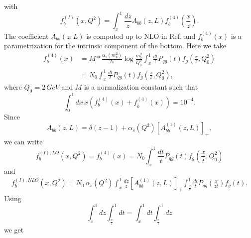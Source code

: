 \documentclass[10pt,a4paper]{article}
\begin{document}
with 
\begin{equation}
f_b^{\left(I\right)}\left(x,Q^2\right)=\int_x^1 \frac{dz}{z}A_{bb}\left(z,L\right)f_b^{\left(4\right)}\left(\frac{x}{z}\right).
\end{equation}
The coefficient $A_{bb}\left(z,L\right) $ is computed up to NLO in Ref.\cite{4} and $f_b^{\left(4\right)}\left(x\right) $ is a parametrization for the intrinsic component of the bottom. Here we take 
\begin{equation}
\begin{split}
f_b^{\left(4\right)}\left(x\right) &= M*\frac{\alpha_s\left(m_b^2\right)}{2\pi}\log\frac{m_b^2}{Q_0^2}\int_x^1 \frac{dt}{t}P_{qg}\left(t\right)f_g\left(\frac{x}{t},Q_0^2\right) \\
&= N_0 \int_x^1 \frac{dt}{t}P_{qg}\left(t\right)f_g\left(\frac{x}{t},Q_0^2\right),
\end{split}
\end{equation}
where $Q_0=2 \,GeV$ and $M$ is a normalization constant such that
\begin{equation}
\int_0^1 dx \, x\left(f_b^{\left(4\right)}\left(x\right)+ f_{\bar{b}}^{\left(4\right)}\left(x\right)\right) = 10^{-4}.
\end{equation}
Since
\begin{equation}
A_{bb}\left(z,L\right)= \delta\left(z-1\right) + \alpha_s\left(Q^2\right)\left[A_{bb}^{\left(1\right)}\left(z,L\right)\right]_{+},
\end{equation}
we can write
\begin{equation}
f_b^{\left(I\right),LO}\left(x,Q^2\right)= f_b^{\left(4\right)}\left(x\right) = N_0\int_x^1 \frac{dt}{t}P_{qg}\left(t\right)f_g\left(\frac{x}{t},Q_0^2\right)
\end{equation} 
and 
\begin{equation}
\begin{split}
f_b^{\left(I\right),NLO}\left(x,Q^2\right)= N_0\,\alpha_s\left(Q^2\right) \int_x^1 \frac{dz}{z} \left[A_{bb}^{\left(1\right)}\left(z,L\right)\right]_{+}\int_{\frac{x}{z}}^{1}\frac{dt}{t}P_{qg}\left(\frac{x}{zt}\right)f_g\left(t\right).
\end{split}
\end{equation}
Using 
\begin{equation}
\int_x^1 dz \int_{\frac{x}{z}}^{1} dt = \int_x^1 dt \int_{\frac{x}{t}}^{1}dz
\end{equation}
we get
\end{document}
